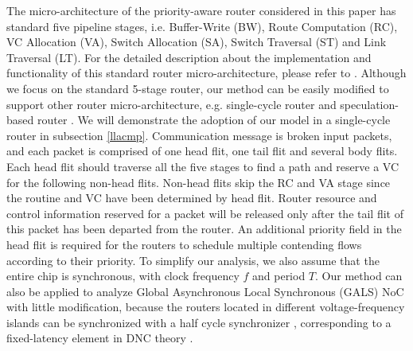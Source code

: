 \documentclass[10pt,journal]{IEEEtran}
\begin{document}
The micro-architecture of the priority-aware router considered in this paper has standard five pipeline stages, i.e. Buffer-Write (BW), Route Computation (RC), VC Allocation (VA), Switch Allocation (SA), Switch Traversal (ST) and Link Traversal (LT). For the detailed description about the implementation and functionality of this standard router micro-architecture, please refer to \cite{jerger2009chip}. Although we focus on the standard 5-stage router, our method can be easily modified to support other router micro-architecture, e.g. single-cycle router \cite{627905}\cite{Shi:2008:RCA:1397757.1397996}\cite{707545}\cite{73} and speculation-based router \cite{jerger2009chip}. We will demonstrate the adoption of our model in a single-cycle router in subsection \ref{llacmp}. Communication message is broken input packets, and each packet is comprised of one head flit, one tail flit and several body flits. Each head flit should traverse all the five stages to find a path and reserve a VC for the following non-head flits. Non-head flits skip the RC and VA stage since the routine and VC have been determined by head flit. Router resource and control information reserved for a packet will be released only after the tail flit of this packet has been departed from the router. An additional priority field in the head flit is required for the routers to schedule multiple contending flows according to their priority. To simplify our analysis, we also assume that the entire chip is synchronous, with clock frequency $f$ and period $T$. Our method can also be applied to analyze Global Asynchronous Local Synchronous (GALS) NoC with little modification, because the routers located in different voltage-frequency islands can be synchronized with a half cycle synchronizer \cite{5476986}, corresponding to a fixed-latency element in DNC theory \cite{Boudec2001Network}.
\end{document}
